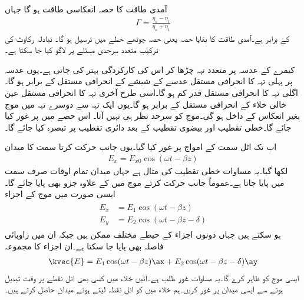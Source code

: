 آمدی طاقت کا  حصہ انعکاسی طاقت ہو گا جہاں
\begin{align}
\Gamma=\frac{\eta_a-\eta_1}{\eta_a+\eta_1}
\end{align}
کے برابر ہے۔آمدی طاقت کا بقایا حصہ یعنی  حصہ چوتھے خطے میں ترسیل ہو گا۔ تبادلہ رکاوٹ کی ترکیب متعدد سرحدی مسئلے پر لاگو کیا جا سکتا ہے۔

کیمرے کے عدسہ پر متعدد تہہ چڑھا کر اس کی کارکردگی بہتر کی جاتی ہے۔یوں عدسہ پر پہلی تہہ کا انحرافی مستقل عدسے کے شیشے کے انحرافی مستقل کے برابر ہو گا۔اگلی تہہ کا انحرافی مستقل قدر کم ہو گا۔اسی طرح آخری تہہ کا انحرافی مستقل عین خالی خلاء کے انحرافی مستقل کے برابر ہو گا۔یوں ایک تہہ سے دوسرے تہہ میں موج بغیر انعکاس کے داخل ہو گی۔موج کو سرحد نظر ہی نہیں آتا۔  
اس حصے میں   پر غور کیا جائے گا۔خطی تقطیب اور بیضوی تقطیب کے بعد دائری تقطیب پر تبصرہ کیا جائے گا۔

اب تک اٹل سمت کے امواج پر غور کیا گیا۔یوں  جانب حرکت کرتا  سمت کا میدان
\begin{align}
E_x = E_{x0} \cos (\omega t -\beta z)
\end{align}
لکھا گیا۔یہ مساوات خطی تقطیب کی مثال ہے جہاں میدان تمام اوقات صرف  سمت میں پایا جاتا ہے۔عموماً  جانب حرکت کرتے موج میں  کے علاوہ  جزو بھی پایا جائے گا۔ایسی صورت میں موج کے اجزاء
\begin{gather}
\begin{aligned}\label{مساوات_قطبیت_عمومی_اجزاء}
E_x&=E_1 \cos (\omega t -\beta z)\\
E_y&=E_2 \cos (\omega t -\beta z -\delta)
\end{aligned}
\end{gather}
ہو سکتے ہیں جہاں دونوں اجزاء کے حیطے مختلف ممکن ہیں جبکہ ان میں زاویائی فاصلہ  بھی پایا جا سکتا ہے۔ان اجزاء کا مجموعہ
\begin{align}\label{مساوات_قطبیت_عمومی_مساوات}
\kvec{E}=E_1 \cos (\omega t -\beta z) \ax+E_2 \cos (\omega t -\beta z -\delta) \ay
\end{align}
ایسی موج کو ظاہر کرے گا۔یہ مساوات غور طلب ہے۔آئیں خلاء میں کسی بھی اٹل نقطے پر وقت تبدیل ہونے سے  ایسی میدان پر غور کریں۔ہم خلاء میں   کو اٹل نقطہ لیتے ہوئے  میدان حاصل کرتے ہیں۔

